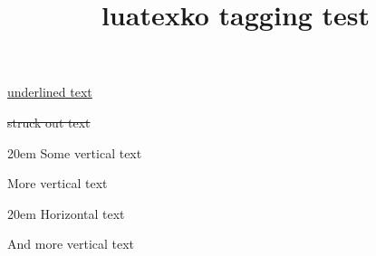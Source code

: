 \documentclass{article}
\title{luatexko tagging test}
\begin{document}



\uline{underlined text}

\sout{struck out text}






\hellipsis

\begin{vertical}{20em}
Some vertical text
\end{vertical}

\begin{verticaltypesetting}
More vertical text
\begin{horizontal}{20em}
Horizontal text
\end{horizontal}
And more vertical text
\end{verticaltypesetting}
\end{document}
